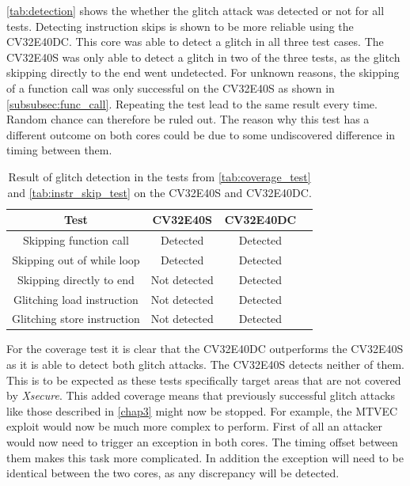 \autoref{tab:detection} shows the whether the glitch attack was detected or not for all tests. Detecting instruction skips is shown to be more reliable using the CV32E40DC. This core was able to detect a glitch in all three test cases. The CV32E40S was only able to detect a glitch in two of the three tests, as the glitch skipping directly to the end went undetected. For unknown reasons, the skipping of a function call was only successful on the CV32E40S as shown in \autoref{subsubsec:func_call}. Repeating the test lead to the same result every time. Random chance can therefore be ruled out. The reason why this test has a different outcome on both cores could be due to some undiscovered difference in timing between them.


\begin{table}[h]
\centering
\caption{Result of glitch detection in the tests from \autoref{tab:coverage_test} and \autoref{tab:instr_skip_test} on the CV32E40S and CV32E40DC.}
\label{tab:detection}
\setlength{\tabcolsep}{10pt} %
\renewcommand{\arraystretch}{1.5} %
\begin{tabular}{c|ccc}
\toprule 
Test                                                & CV32E40S                                      & CV32E40DC             \\     
\midrule 
\rowcolor{black!20} {Skipping function call}        & {\cellcolor[HTML]{34FF34}}{Detected} & {\cellcolor[HTML]{34FF34}}{Detected} \\ 
                    {Skipping out of while loop}    & {\cellcolor[HTML]{34FF34}}{Detected} & {\cellcolor[HTML]{34FF34}}{Detected} \\
\rowcolor{black!20} {Skipping directly to end}      & {\cellcolor[HTML]{CB0000}}{Not detected} & {\cellcolor[HTML]{34FF34}}{Detected} \\ 
                    {Glitching load instruction}    & {\cellcolor[HTML]{CB0000}}{Not detected} & {\cellcolor[HTML]{34FF34}}{Detected} \\ 
\rowcolor{black!20} {Glitching store instruction}   & {\cellcolor[HTML]{CB0000}}{Not detected} & {\cellcolor[HTML]{34FF34}}{Detected} \\
\bottomrule
\end{tabular}
\end{table}

For the coverage test it is clear that the CV32E40DC outperforms the CV32E40S as it is able to detect both glitch attacks. The CV32E40S detects neither of them. This is to be expected as these tests specifically target areas that are not covered by \textit{Xsecure}. This added coverage means that previously successful glitch attacks like those described in \autoref{chap3} might now be stopped. For example, the MTVEC exploit\cite{mtvec_corruption} would now be much more complex to perform. First of all an attacker would now need to trigger an exception in both cores. The timing offset between them makes this task more complicated. In addition the exception will need to be identical between the two cores, as any discrepancy will be detected. 